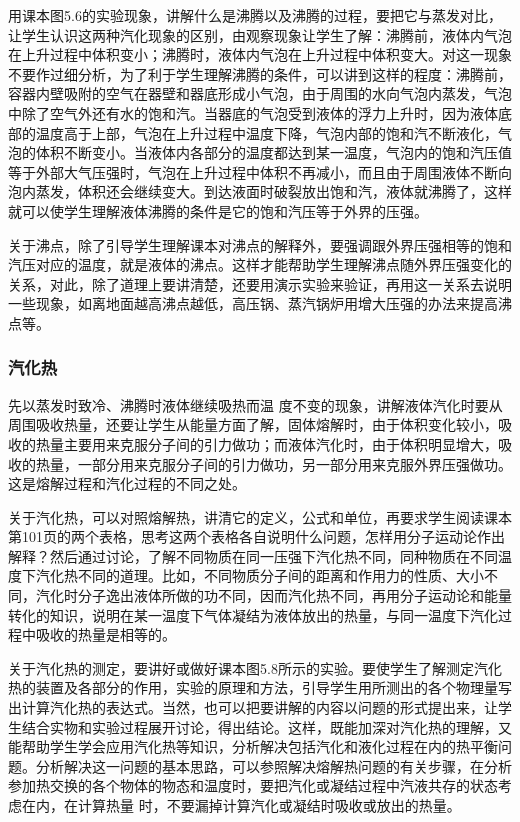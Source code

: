 用课本图5.6的实验现象，讲解什么是沸腾以及沸腾的过程，要把它与蒸发对比，让学生认识这两种汽化现象的区别，由观察现象让学生了解：沸腾前，液体内气泡在上升过程中体积变小；沸腾时，液体内气泡在上升过程中体积变大。对这一现象不要作过细分析，为了利于学生理解沸腾的条件，可以讲到这样的程度：沸腾前，容器内壁吸附的空气在器壁和器底形成小气泡，由于周围的水向气泡内蒸发，气泡中除了空气外还有水的饱和汽。当器底的气泡受到液体的浮力上升时，因为液体底部的温度高于上部，气泡在上升过程中温度下降，气泡内部的饱和汽不断液化，气泡的体积不断变小。当液体内各部分的温度都达到某一温度，气泡内的饱和汽压值等于外部大气压强时，气泡在上升过程中体积不再减小，而且由于周围液体不断向泡内蒸发，体积还会继续变大。到达液面时破裂放出饱和汽，液体就沸腾了，这样就可以使学生理解液体沸腾的条件是它的饱和汽压等于外界的压强。

关于沸点，除了引导学生理解课本对沸点的解释外，要强调跟外界压强相等的饱和汽压对应的温度，就是液体的沸点。这样才能帮助学生理解沸点随外界压强变化的关系，对此，除了道理上要讲清楚，还要用演示实验来验证，再用这一关系去说明一些现象，如离地面越高沸点越低，高压锅、蒸汽锅炉用增大压强的办法来提高沸点等。

\subsubsection{汽化热} 

先以蒸发时致冷、沸腾时液体继续吸热而温
度不变的现象，讲解液体汽化时要从周围吸收热量，还要让学生从能量方面了解，固体熔解时，由于体积变化较小，吸收的热量主要用来克服分子间的引力做功；而液体汽化时，由于体积明显增大，吸收的热量，一部分用来克服分子间的引力做功，另一部分用来克服外界压强做功。这是熔解过程和汽化过程的不同之处。

关于汽化热，可以对照熔解热，讲清它的定义，公式和单位，再要求学生阅读课本第101页的两个表格，思考这两个表格各自说明什么问题，怎样用分子运动论作出解释？然后通过讨论，了解不同物质在同一压强下汽化热不同，同种物质在不同温度下汽化热不同的道理。比如，不同物质分子间的距离和作用力的性质、大小不同，汽化时分子逸出液体所做的功不同，因而汽化热不同，再用分子运动论和能量转化的知识，说明在某一温度下气体凝结为液体放出的热量，与同一温度下汽化过程中吸收的热量是相等的。

关于汽化热的测定，要讲好或做好课本图5.8所示的实验。要使学生了解测定汽化热的装置及各部分的作用，实验的原理和方法，引导学生用所测出的各个物理量写出计算汽化热的表达式。当然，也可以把要讲解的内容以问题的形式提出来，让学生结合实物和实验过程展开讨论，得出结论。这样，既能加深对汽化热的理解，又能帮助学生学会应用汽化热等知识，分析解决包括汽化和液化过程在内的热平衡问题。分析解决这一问题的基本思路，可以参照解决熔解热问题的有关步骤，在分析参加热交换的各个物体的物态和温度时，要把汽化或凝结过程中汽液共存的状态考虑在内，在计算热量
时，不要漏掉计算汽化或凝结时吸收或放出的热量。

